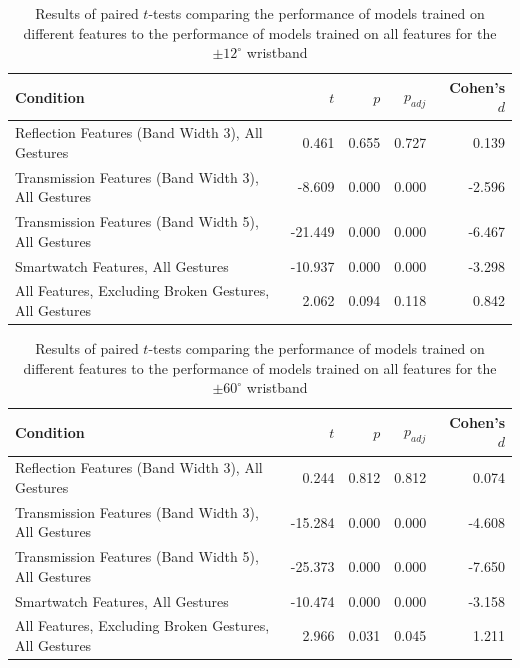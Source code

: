 \documentclass[ oneside,%
                    author={Jack Jarvis},
                    degree={BSc},
                     title={FlexIR: Flexible PCB Wristbands for Infrared Based Gesture Recognition},
                    unit={COMS30045},
                    subtitle={Investigating the Effect of LED Viewing Angle on Gesture Classification in Infrared Sensing Systems}]{dissertation}
\begin{document}
\begin{table}[htp]
    \centering
   \begin{tabular}{lrrrr}
        \toprule
        Condition & $t$ & $p$ & $p_{adj}$ & Cohen's $d$ \\
        \midrule
        Reflection Features (Band Width 3), All Gestures & 0.461 & 0.655 & 0.727 & 0.139 \\
        Transmission Features (Band Width 3), All Gestures & -8.609 & 0.000 & 0.000 & -2.596 \\
        Transmission Features (Band Width 5), All Gestures & -21.449 & 0.000 & 0.000 & -6.467 \\
        Smartwatch Features, All Gestures & -10.937 & 0.000 & 0.000 & -3.298 \\
        All Features, Excluding Broken Gestures, All Gestures & 2.062 & 0.094 & 0.118 & 0.842 \\
        \bottomrule
    \end{tabular}
    \caption{Results of paired $t$-tests comparing the performance of models trained on different features to the performance of models trained on all features for the $\pm 12^\circ$ wristband}
    \label{tab:training_set_results_12}
\end{table}

\begin{table}[htp]
    \centering
    \begin{tabular}{lrrrr}
        \toprule
        Condition & $t$ & $p$ & $p_{adj}$ & Cohen's $d$ \\
        \midrule
        Reflection Features (Band Width 3), All Gestures & 0.244 & 0.812 & 0.812 & 0.074 \\
        Transmission Features (Band Width 3), All Gestures & -15.284 & 0.000 & 0.000 & -4.608 \\
        Transmission Features (Band Width 5), All Gestures & -25.373 & 0.000 & 0.000 & -7.650 \\
        Smartwatch Features, All Gestures & -10.474 & 0.000 & 0.000 & -3.158 \\
        All Features, Excluding Broken Gestures, All Gestures & 2.966 & 0.031 & 0.045 & 1.211 \\
        \bottomrule
    \end{tabular}
    \caption{Results of paired $t$-tests comparing the performance of models trained on different features to the performance of models trained on all features for the $\pm 60^\circ$ wristband}
    \label{tab:training_set_results_60}
\end{table}
\end{document}

